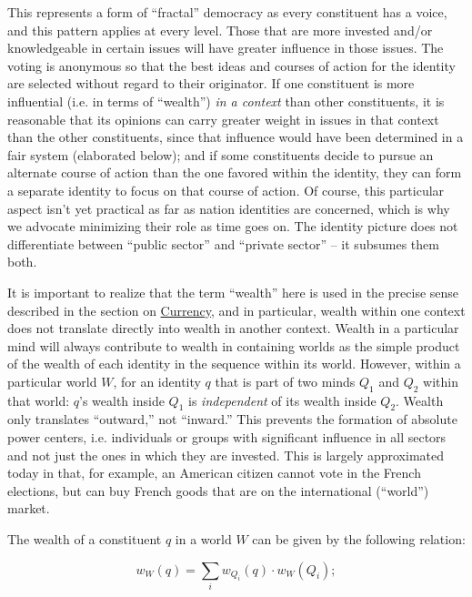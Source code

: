 \documentclass[pra,twocolumn,groupedaddress,10pt]{revtex4}
\theoremstyle{definition}
\begin{document}
This represents a form of ``fractal'' democracy as every constituent has a voice, and this pattern applies at every level. Those that are more invested and/or knowledgeable in certain issues will have greater influence in those issues. The voting is anonymous so that the best ideas and courses of action for the identity are selected without regard to their originator. If one constituent is more influential (i.e. in terms of ``wealth'') \textit{in a context} than other constituents, it is reasonable that its opinions can carry greater weight in issues in that context than the other constituents, since that influence would have been determined in a fair system (elaborated below); and if some constituents decide to pursue an alternate course of action than the one favored within the identity, they can form a separate identity to focus on that course of action. Of course, this particular aspect isn't yet practical as far as nation identities are concerned, which is why we advocate minimizing their role as time goes on. The identity picture does not differentiate between ``public sector'' and ``private sector'' -- it subsumes them both.

It is important to realize that the term ``wealth'' here is used in the precise sense described in the section on \hyperref[sec:currency]{Currency}, and in particular, wealth within one context does not translate directly into wealth in another context. Wealth in a particular mind will always contribute to wealth in containing worlds as the simple product of the wealth of each identity in the sequence within its world. However, within a particular world $W$, for an identity $q$ that is part of two minds $Q_{1}$ and $Q_{2}$ within that world: $q$'s wealth inside $Q_{1}$ is \textit{independent} of its wealth inside $Q_{2}$. Wealth only translates ``outward,'' not ``inward.'' This prevents the formation of absolute power centers, i.e. individuals or groups with significant influence in all sectors and not just the ones in which they are invested. This is largely approximated today in that, for example, an American citizen cannot vote in the French elections, but can buy French goods that are on the international (``world'') market.

The wealth of a constituent $q$ in a world $W$ can be given by the following relation:

\begin{equation}
	w_{W}(q) = \sum_{i} w_{Q_i}(q) \cdot w_{W}(Q_i) ;\label{eq:wealth}
\end{equation}
\end{document}
